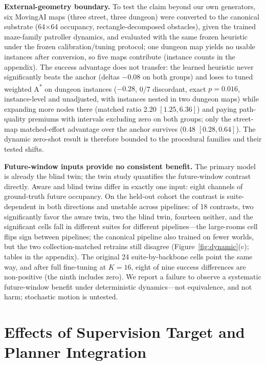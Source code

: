 \documentclass[letterpaper]{article} %
\begin{document}
\textbf{External-geometry boundary.} To test the claim beyond our own generators, six MovingAI maps \citep{sturtevant2012movingai} (three street, three dungeon) were converted to the canonical substrate (64$\times$64 occupancy, rectangle-decomposed obstacles), given the trained maze-family patroller dynamics, and evaluated with the same frozen heuristic under the frozen calibration/tuning protocol; one dungeon map yields no usable instances after conversion, so five maps contribute (instance counts in the appendix). The success advantage does not transfer: the learned heuristic never significantly beats the anchor (deltas $-0.08$ on both groups) and loses to tuned weighted A\textsuperscript{*} on dungeon instances ($-0.28$, 0/7 discordant, exact $p{=}0.016$, instance-level and unadjusted, with instances nested in two dungeon maps) while expanding more nodes there (matched ratio 2.20 $[1.25, 6.36]$) and paying path-quality premiums with intervals excluding zero on both groups; only the street-map matched-effort advantage over the anchor survives (0.48 $[0.28, 0.64]$). The dynamic zero-shot result is therefore bounded to the procedural families and their tested shifts.

\textbf{Future-window inputs provide no consistent benefit.} The primary model is already the blind twin; the twin study quantifies the future-window contrast directly. Aware and blind twins differ in exactly one input: eight channels of ground-truth future occupancy. On the held-out cohort the contrast is suite-dependent in both directions and unstable across pipelines: of 18 contrasts, two significantly favor the aware twin, two the blind twin, fourteen neither, and the significant cells fall in different suites for different pipelines---the large-rooms cell flips sign between pipelines; the canonical pipeline also trained on fewer worlds, but the two collection-matched retrains still disagree (Figure~\ref{fig:dynamic}(c); tables in the appendix). The original 24 suite-by-backbone cells point the same way, and after full fine-tuning at $K{=}16$, eight of nine success differences are non-positive (the ninth includes zero). We report a failure to observe a systematic future-window benefit under deterministic dynamics---not equivalence, and not harm; stochastic motion is untested.

\section{Effects of Supervision Target and Planner Integration}
\end{document}
